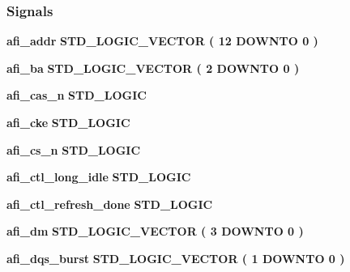 \subsubsection*{Signals}
 \begin{DoxyCompactItemize}
\item 
{\bf afi\+\_\+addr} {\bfseries \textcolor{comment}{S\+T\+D\+\_\+\+L\+O\+G\+I\+C\+\_\+\+V\+E\+C\+T\+OR}\textcolor{vhdlchar}{ }\textcolor{vhdlchar}{(}\textcolor{vhdlchar}{ }\textcolor{vhdlchar}{ } \textcolor{vhdldigit}{12} \textcolor{vhdlchar}{ }\textcolor{keywordflow}{D\+O\+W\+N\+TO}\textcolor{vhdlchar}{ }\textcolor{vhdlchar}{ } \textcolor{vhdldigit}{0} \textcolor{vhdlchar}{ }\textcolor{vhdlchar}{)}\textcolor{vhdlchar}{ }} 
\item 
{\bf afi\+\_\+ba} {\bfseries \textcolor{comment}{S\+T\+D\+\_\+\+L\+O\+G\+I\+C\+\_\+\+V\+E\+C\+T\+OR}\textcolor{vhdlchar}{ }\textcolor{vhdlchar}{(}\textcolor{vhdlchar}{ }\textcolor{vhdlchar}{ } \textcolor{vhdldigit}{2} \textcolor{vhdlchar}{ }\textcolor{keywordflow}{D\+O\+W\+N\+TO}\textcolor{vhdlchar}{ }\textcolor{vhdlchar}{ } \textcolor{vhdldigit}{0} \textcolor{vhdlchar}{ }\textcolor{vhdlchar}{)}\textcolor{vhdlchar}{ }} 
\item 
{\bf afi\+\_\+cas\+\_\+n} {\bfseries \textcolor{comment}{S\+T\+D\+\_\+\+L\+O\+G\+IC}\textcolor{vhdlchar}{ }} 
\item 
{\bf afi\+\_\+cke} {\bfseries \textcolor{comment}{S\+T\+D\+\_\+\+L\+O\+G\+IC}\textcolor{vhdlchar}{ }} 
\item 
{\bf afi\+\_\+cs\+\_\+n} {\bfseries \textcolor{comment}{S\+T\+D\+\_\+\+L\+O\+G\+IC}\textcolor{vhdlchar}{ }} 
\item 
{\bf afi\+\_\+ctl\+\_\+long\+\_\+idle} {\bfseries \textcolor{comment}{S\+T\+D\+\_\+\+L\+O\+G\+IC}\textcolor{vhdlchar}{ }} 
\item 
{\bf afi\+\_\+ctl\+\_\+refresh\+\_\+done} {\bfseries \textcolor{comment}{S\+T\+D\+\_\+\+L\+O\+G\+IC}\textcolor{vhdlchar}{ }} 
\item 
{\bf afi\+\_\+dm} {\bfseries \textcolor{comment}{S\+T\+D\+\_\+\+L\+O\+G\+I\+C\+\_\+\+V\+E\+C\+T\+OR}\textcolor{vhdlchar}{ }\textcolor{vhdlchar}{(}\textcolor{vhdlchar}{ }\textcolor{vhdlchar}{ } \textcolor{vhdldigit}{3} \textcolor{vhdlchar}{ }\textcolor{keywordflow}{D\+O\+W\+N\+TO}\textcolor{vhdlchar}{ }\textcolor{vhdlchar}{ } \textcolor{vhdldigit}{0} \textcolor{vhdlchar}{ }\textcolor{vhdlchar}{)}\textcolor{vhdlchar}{ }} 
\item 
{\bf afi\+\_\+dqs\+\_\+burst} {\bfseries \textcolor{comment}{S\+T\+D\+\_\+\+L\+O\+G\+I\+C\+\_\+\+V\+E\+C\+T\+OR}\textcolor{vhdlchar}{ }\textcolor{vhdlchar}{(}\textcolor{vhdlchar}{ }\textcolor{vhdlchar}{ } \textcolor{vhdldigit}{1} \textcolor{vhdlchar}{ }\textcolor{keywordflow}{D\+O\+W\+N\+TO}\textcolor{vhdlchar}{ }\textcolor{vhdlchar}{ } \textcolor{vhdldigit}{0} \textcolor{vhdlchar}{ }\textcolor{vhdlchar}{)}\textcolor{vhdlchar}{ }} 

\end{DoxyCompactItemize}
